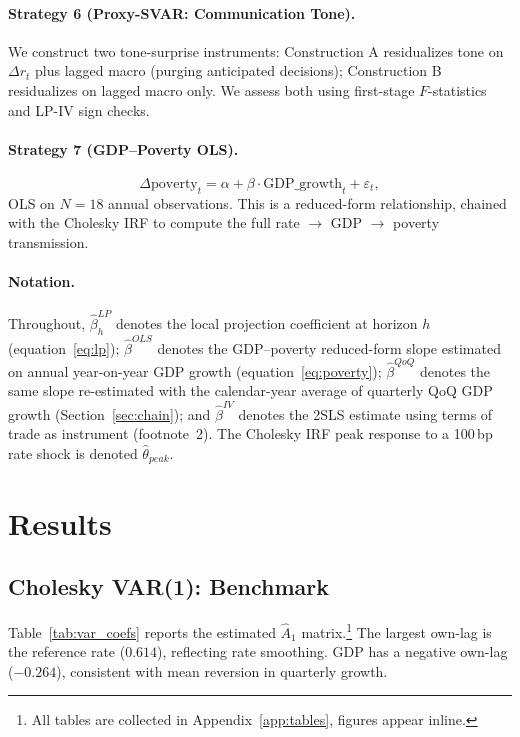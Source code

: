 \documentclass[12pt,letterpaper]{article}
\begin{document}
\paragraph{Strategy 6 (Proxy-SVAR: Communication Tone).}
We construct two tone-surprise instruments: Construction A residualizes
tone on $\Delta r_t$ plus lagged macro (purging anticipated decisions);
Construction B residualizes on lagged macro only. We assess both using
first-stage $F$-statistics \citep{montiellolea2021} and LP-IV sign checks.

\paragraph{Strategy 7 (GDP--Poverty OLS).}
\begin{equation}
  \Delta\mathrm{poverty}_t = \alpha + \beta\cdot\mathrm{GDP\_growth}_t
    + \varepsilon_t,
  \label{eq:poverty}
\end{equation}
OLS on $N=18$ annual observations. This is a reduced-form relationship,
chained with the Cholesky IRF to compute the full rate $\to$ GDP $\to$
poverty transmission.

\paragraph{Notation.}
Throughout, $\hat{\beta}_h^{LP}$ denotes the local projection coefficient
at horizon $h$ (equation~\eqref{eq:lp});
$\hat{\beta}^{OLS}$ denotes the GDP--poverty reduced-form slope estimated
on annual year-on-year GDP growth (equation~\eqref{eq:poverty});
$\hat{\beta}^{QoQ}$ denotes the same slope re-estimated with the
calendar-year average of quarterly QoQ GDP growth (Section~\ref{sec:chain});
and $\hat{\beta}^{IV}$ denotes the 2SLS estimate using terms of trade as
instrument (footnote~2).
The Cholesky IRF peak response to a 100\,bp rate shock is denoted
$\hat{\theta}_{peak}$.

\section{Results}
\label{sec:results}

\subsection{Cholesky VAR(1): Benchmark}
\label{sec:cholesky}

Table~\ref{tab:var_coefs} reports the estimated $\hat A_1$ matrix.\footnote{All tables are collected in Appendix~\ref{app:tables}, figures appear inline.}
The largest own-lag is the reference rate ($0.614$), reflecting rate smoothing.
GDP has a negative own-lag ($-0.264$), consistent with mean reversion in
quarterly growth.
\end{document}
